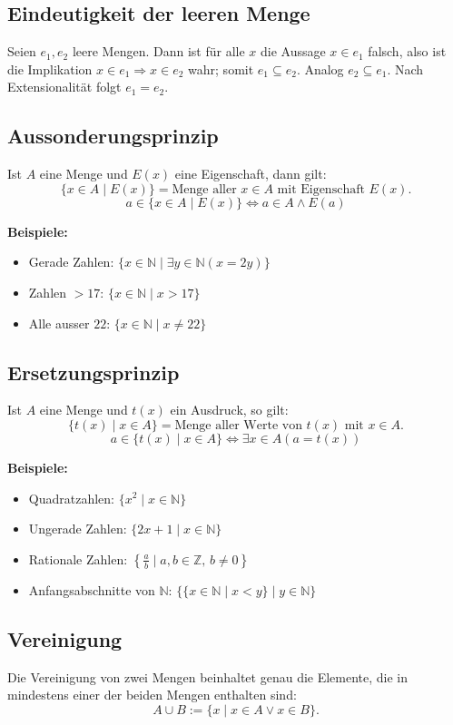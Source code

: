 \documentclass[10pt,landscape]{article}
\begin{document}
\begin{multicols*}{4}
\subsection{Eindeutigkeit der leeren Menge}
Seien \(e_1,e_2\) leere Mengen. Dann ist für alle \(x\) die Aussage \(x\in e_1\) falsch, also ist die Implikation \(x\in e_1\Rightarrow x\in e_2\) wahr; somit \(e_1\subseteq e_2\). Analog \(e_2\subseteq e_1\). Nach Extensionalität folgt \(e_1=e_2\).


\subsection{Aussonderungsprinzip}
Ist \(A\) eine Menge und \(E(x)\) eine Eigenschaft, dann gilt:
\[
\{x \in A \mid E(x)\} = \text{Menge aller } x \in A \text{ mit Eigenschaft } E(x).
\]
\[
a \in \{x \in A \mid E(x)\} \iff a \in A \land E(a)
\]

\textbf{Beispiele:}
\begin{itemize}
  \item Gerade Zahlen: \(\{x \in \mathbb{N} \mid \exists y \in \mathbb{N} (x = 2y)\}\)
  \item Zahlen \(> 17\): \(\{x \in \mathbb{N} \mid x > 17\}\)
  \item Alle ausser \(22\): \(\{x \in \mathbb{N} \mid x \neq 22\}\)
\end{itemize}

\subsection{Ersetzungsprinzip}
Ist \(A\) eine Menge und \(t(x)\) ein Ausdruck, so gilt:
\[ \{t(x) \mid x \in A\} = \text{Menge aller Werte von } t(x) \text{ mit } x \in A. \]
\[ a \in \{t(x) \mid x \in A\} \iff \exists x \in A (a = t(x)) \]

\textbf{Beispiele:}
\begin{itemize}
  \item Quadratzahlen: \(\{x^2 \mid x \in \mathbb{N}\}\)
  \item Ungerade Zahlen: \(\{2x + 1 \mid x \in \mathbb{N}\}\)
  \item Rationale Zahlen: \(\left\{\frac{a}{b} \mid a,b \in \mathbb{Z},\, b \neq 0\right\}\)
  \item Anfangsabschnitte von \(\mathbb{N}\): \(\{\{x \in \mathbb{N} \mid x < y\} \mid y \in \mathbb{N}\}\)
\end{itemize}




\subsection{Vereinigung}
Die Vereinigung von zwei Mengen beinhaltet genau die Elemente, die in mindestens einer der beiden Mengen enthalten sind:
\[
A\cup B:=\{x\mid x\in A\vee x\in B\}.
\]


\end{multicols*}
\end{document}
